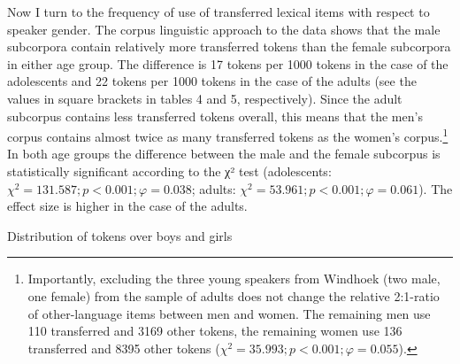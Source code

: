 \documentclass[output=paper]{langsci/langscibook}
\begin{document}
Now I turn to the frequency of use of transferred lexical items with respect to speaker gender. The corpus linguistic approach to the data shows that the male subcorpora contain relatively more transferred tokens than the female subcorpora in either age group. The difference is 17 tokens per 1000 tokens in the case of the adolescents and 22 tokens per 1000 tokens in the case of the adults (see the values in square brackets in tables 4 and 5, respectively). Since the adult subcorpus contains less transferred tokens overall, this means that the men’s corpus contains almost twice as many transferred tokens as the women’s corpus.\footnote{Importantly, excluding the three young speakers from Windhoek (two male, one female) from the sample of adults does not change the relative 2:1-ratio of other-language items between men and women. The remaining men use 110 transferred and 3169 other tokens, the remaining women use 136 transferred and 8395 other tokens ($\chi^2 = 35.993; p < 0.001; \varphi = 0.055$).} In both age groups the difference between the male and the female subcorpus is statistically significant according to the χ² test (adolescents: $\chi^2 = 131.587; p < 0.001; \varphi = 0.038$; adults: $\chi^2 = 53.961; p < 0.001; \varphi = 0.061$). The effect size is higher in the case of the adults.

\begin{table}
\begin{floatrow}\captionsetup{margin=.1\textwidth}
{\caption{Distribution of tokens over boys and girls\label{tab:bracke:4}}}%
{\caption{Distribution of tokens over men and women\label{tab:bracke:5}}}
\end{floatrow}
\end{table}  
\end{document}
